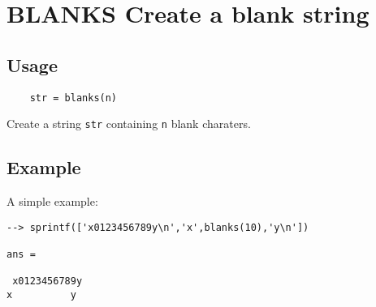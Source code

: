 \section{BLANKS Create a blank string}

\subsection{Usage}

\begin{verbatim}
    str = blanks(n)
\end{verbatim}
Create a string \verb|str| containing \verb|n| blank charaters.
\subsection{Example}

A simple example:
\begin{verbatim}
--> sprintf(['x0123456789y\n','x',blanks(10),'y\n'])

ans = 

 x0123456789y
x          y
\end{verbatim}
